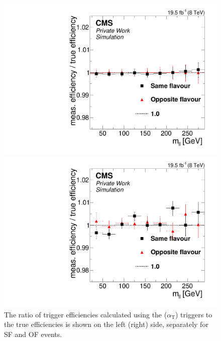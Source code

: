 \begin{figure}
\begin{center}
\begin{minipage}[t]{0.49\textwidth}
\includegraphics[scale=0.375]{plots/BG/trigger/Triggereff_AlphaTSyst_PFHT_HighHTExclusive_Full2012_Mll_None.pdf}
\end{minipage}
\begin{minipage}[t]{0.49\textwidth}
\includegraphics[scale=0.375]{plots/BG/trigger/Triggereff_AlphaTSyst_AlphaT_HighHTExclusive_Full2012_Mll_None.pdf}
\end{minipage}
\caption{The ratio of trigger efficiencies calculated using the \HT ($\alpha_{\mathrm{T}}$) triggers to the true efficiencies is shown on the left (right) side, separately for SF and OF events.}
\label{fig:triggerEffBias}
\end{center}
\end{figure}

